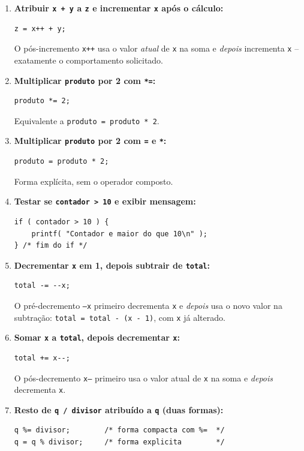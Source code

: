 \documentclass[12pt,a4paper]{article}
\begin{document}
\begin{respostabox}
\begin{enumerate}[label=\textbf{\alph*)}]

\item \textbf{Atribuir \texttt{x + y} a \texttt{z} e incrementar \texttt{x} após o cálculo:}
\begin{lstlisting}
z = x++ + y;
\end{lstlisting}
O pós-incremento \texttt{x++} usa o valor \textit{atual} de \texttt{x} na soma e
\textit{depois} incrementa \texttt{x} -- exatamente o comportamento solicitado.

\item \textbf{Multiplicar \texttt{produto} por 2 com \texttt{*=}:}
\begin{lstlisting}
produto *= 2;
\end{lstlisting}
Equivalente a \texttt{produto = produto * 2}.

\item \textbf{Multiplicar \texttt{produto} por 2 com \texttt{=} e \texttt{*}:}
\begin{lstlisting}
produto = produto * 2;
\end{lstlisting}
Forma explícita, sem o operador composto.

\item \textbf{Testar se \texttt{contador > 10} e exibir mensagem:}
\begin{lstlisting}
if ( contador > 10 ) {
    printf( "Contador e maior do que 10\n" );
} /* fim do if */
\end{lstlisting}

\item \textbf{Decrementar \texttt{x} em 1, depois subtrair de \texttt{total}:}
\begin{lstlisting}
total -= --x;
\end{lstlisting}
O pré-decremento \texttt{--x} primeiro decrementa \texttt{x} e \textit{depois} usa o
novo valor na subtração: \texttt{total = total - (x - 1)}, com \texttt{x} já alterado.

\item \textbf{Somar \texttt{x} a \texttt{total}, depois decrementar \texttt{x}:}
\begin{lstlisting}
total += x--;
\end{lstlisting}
O pós-decremento \texttt{x--} primeiro usa o valor atual de \texttt{x} na soma e
\textit{depois} decrementa \texttt{x}.

\item \textbf{Resto de \texttt{q / divisor} atribuído a \texttt{q} (duas formas):}
\begin{lstlisting}
q %= divisor;        /* forma compacta com %=  */
q = q % divisor;     /* forma explicita        */
\end{lstlisting}


\end{enumerate}
\end{respostabox}
\end{document}
